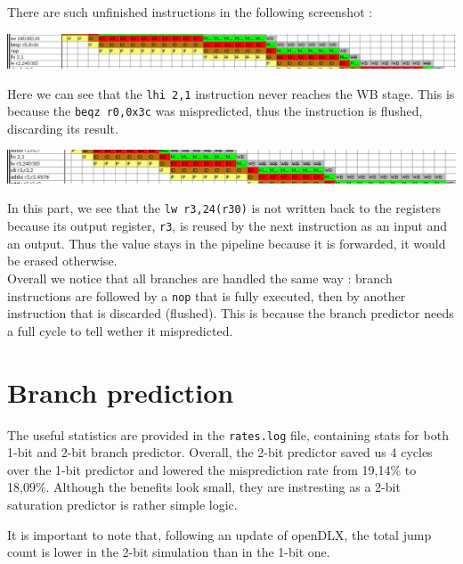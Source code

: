 \documentclass[a4paper]{report}
\begin{document}
There are such unfinished instructions in the following screenshot :

\begin{center}
	\includegraphics[width=\textwidth-2cm]{images/pipeline_no_writeback_after_branching.png}
\end{center}

Here we can see that the \texttt{lhi 2,1} instruction never reaches the WB stage. This is because the
\texttt{beqz~r0,0x3c} was mispredicted, thus the instruction is flushed, discarding its result.

\begin{center}
	\includegraphics[width=\textwidth-2cm]{images/pipeline_no_writeback_after_forwarding.png}
\end{center}

In this part, we see that the \texttt{lw~r3,24(r30)} is not written back to the registers because its output
register, \texttt{r3}, is reused by the next instruction as an input and an output. Thus the value stays in
the pipeline because it is forwarded, it would be erased otherwise.
\mbox{}\\

Overall we notice that all branches are handled the same way : branch instructions are followed by a
\texttt{nop} that is fully executed, then by another instruction that is discarded (flushed). This is because
the branch predictor needs a full cycle to tell wether it mispredicted.

\section{Branch prediction}

The useful statistics are provided in the \texttt{rates.log} file, containing stats for both 1-bit and 2-bit
branch predictor. Overall, the 2-bit predictor saved us 4 cycles over the 1-bit predictor and lowered the
misprediction rate from 19,14\% to 18,09\%. Although the benefits look small, they are instresting as a 2-bit
saturation predictor is rather simple logic.

It is important to note that, following an update of openDLX, the total jump count is lower in the 2-bit
simulation than in the 1-bit one.
\mbox{}\\
\end{document}
